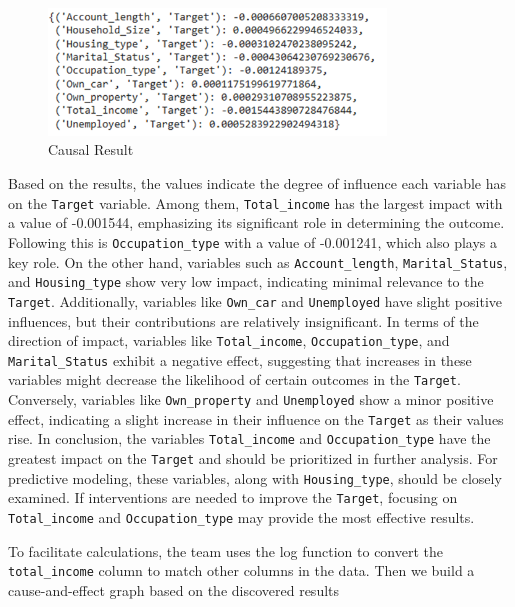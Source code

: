 \documentclass[12pt]{report}
\begin{document}
    \begin{figure}[h!]
        \centering
        \includegraphics[width=0.8\textwidth]{resources/pic/Casual Result.png}
        \caption{Causal Result}
        \label{fig:Casual Result}        
    \end{figure}

    Based on the results, the values indicate the degree of influence each variable has on the \texttt{Target} variable. Among them, \texttt{Total\_income} has the largest impact with a value of -0.001544, emphasizing its significant role in determining the outcome. Following this is \texttt{Occupation\_type} with a value of -0.001241, which also plays a key role. On the other hand, variables such as \texttt{Account\_length}, \texttt{Marital\_Status}, and \texttt{Housing\_type} show very low impact, indicating minimal relevance to the \texttt{Target}. Additionally, variables like \texttt{Own\_car} and \texttt{Unemployed} have slight positive influences, but their contributions are relatively insignificant. In terms of the direction of impact, variables like \texttt{Total\_income}, \texttt{Occupation\_type}, and \texttt{Marital\_Status} exhibit a negative effect, suggesting that increases in these variables might decrease the likelihood of certain outcomes in the \texttt{Target}. Conversely, variables like \texttt{Own\_property} and \texttt{Unemployed} show a minor positive effect, indicating a slight increase in their influence on the \texttt{Target} as their values rise. In conclusion, the variables \texttt{Total\_income} and \texttt{Occupation\_type} have the greatest impact on the \texttt{Target} and should be prioritized in further analysis. For predictive modeling, these variables, along with \texttt{Housing\_type}, should be closely examined. If interventions are needed to improve the \texttt{Target}, focusing on \texttt{Total\_income} and \texttt{Occupation\_type} may provide the most effective results.

    To facilitate calculations, the team uses the log function to convert the \texttt{total\_income} column to match other columns in the data. Then we build a cause-and-effect graph based on the discovered results
\end{document}
